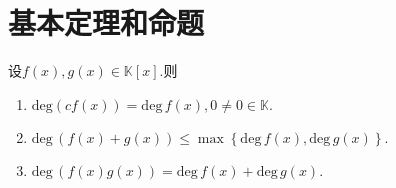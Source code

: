 \documentclass[../../main.tex]{subfiles}
\begin{document}
\section{基本定理和命题}

\begin{proposition}[多项式次数的性质]\label{proposition:多项式次数的性质}
设$f(x),g(x)\in \mathbb{K}[x]$.则
\begin{enumerate}
\item $\mathrm{deg}\left( cf\left( x \right) \right) =\mathrm{deg}\,f\left( x \right) ,0\ne 0\in \mathbb{K} .$

\item $\mathrm{deg}\,\left( f\left( x \right) +g\left( x \right) \right) \leqslant\max \left\{ \mathrm{deg}\,f\left( x \right) ,\mathrm{deg}\,g\left( x \right) \right\} .$

\item $\mathrm{deg}\,\left( f\left( x \right) g\left( x \right) \right) =\mathrm{deg}\,f\left( x \right) +\mathrm{deg}\,g\left( x \right).$
\end{enumerate}
\end{proposition}
\end{document}
